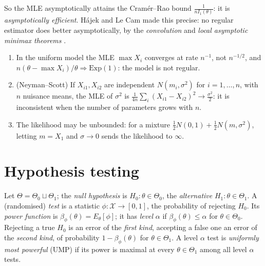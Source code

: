 So the MLE asymptotically attains the Cram\'er--Rao bound $\frac{1}{nI_1(\theta)}$: it is \emph{asymptotically efficient}. H\'ajek and Le Cam made this precise: no regular estimator does better asymptotically, by the
\emph{convolution} and \emph{local asymptotic minimax theorems} \cite{van-der-vaart}.

\begin{counterexample}\label{statistics:counterexample-mle}
\begin{enumerate}
\item In the uniform model the MLE $\max X_i$ converges at rate $n^{-1}$, not $n^{-1/2}$, and $n(\theta - \max X_i)/\theta \Rightarrow \mathrm{Exp}(1)$: the model is not regular.
\item (Neyman--Scott) If $X_{i1}, X_{i2}$ are independent $N(m_i, \sigma^2)$ for $i = 1, \ldots, n$, with $n$ nuisance means, the MLE of $\sigma^2$ is $\frac{1}{4n}\sum_i(X_{i1} - X_{i2})^2 \to \frac{\sigma^2}{2}$: it is inconsistent when the number of
parameters grows with $n$.
\item The likelihood may be unbounded: for a mixture $\frac12N(0, 1) + \frac12N(m, \sigma^2)$, letting $m = X_1$ and $\sigma \to 0$ sends the likelihood to $\infty$.
\end{enumerate}
\end{counterexample}

\section{Hypothesis testing}\label{statistics:section-tests}

\begin{definition}\label{statistics:definition-test}
Let $\Theta = \Theta_0 \sqcup \Theta_1$; the \emph{null hypothesis} is $H_0 : \theta \in \Theta_0$, the \emph{alternative} $H_1 : \theta \in \Theta_1$. A (randomised) \emph{test} is a statistic $\phi \colon \mathcal{X} \to [0, 1]$, the probability of rejecting
$H_0$. Its \emph{power function} is $\beta_\phi(\theta) = E_\theta[\phi]$; it has \emph{level} $\alpha$ if $\beta_\phi(\theta) \leq \alpha$ for $\theta \in \Theta_0$. Rejecting a true $H_0$ is an error of the \emph{first kind}, accepting a false
one an error of the \emph{second kind}, of probability $1 - \beta_\phi(\theta)$ for $\theta \in \Theta_1$. A level $\alpha$ test is \emph{uniformly most powerful} (UMP) if its power is maximal at every $\theta \in \Theta_1$ among all level
$\alpha$ tests.
\end{definition}

